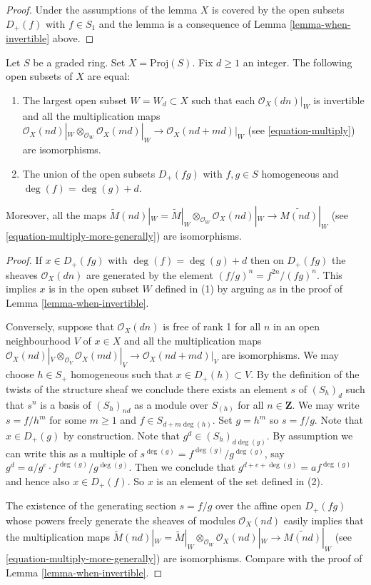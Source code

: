 \begin{proof}
Under the assumptions of the lemma $X$ is covered by the
open subsets $D_{+}(f)$ with $f \in S_1$ and the
lemma is a consequence of Lemma \ref{lemma-when-invertible} above.
\end{proof}

\begin{lemma}
\label{lemma-where-invertible}
Let $S$ be a graded ring. Set $X = \text{Proj}(S)$. Fix $d \geq 1$ an
integer. The following open subsets of $X$ are equal:
\begin{enumerate}
\item The largest open subset $W = W_d \subset X$ such that
each $\mathcal{O}_X(dn)|_W$ is invertible and all the
multiplication maps
$\mathcal{O}_X(nd)|_W \otimes_{\mathcal{O}_W} \mathcal{O}_X(md)|_W
\to \mathcal{O}_X(nd + md)|_W$
(see \ref{equation-multiply}) are isomorphisms.
\item The union of the open subsets $D_{+}(fg)$ with
$f, g \in S$ homogeneous and $\deg(f) = \deg(g) + d$.
\end{enumerate}
Moreover, all the maps
$\widetilde M(nd)|_W = \widetilde M|_W \otimes_{\mathcal{O}_W}
\mathcal{O}_X(nd)|_W \to \widetilde{M(nd)}|_W$
(see \ref{equation-multiply-more-generally}) are isomorphisms.
\end{lemma}

\begin{proof}
If $x \in D_{+}(fg)$ with $\deg(f) = \deg(g) + d$ then
on $D_{+}(fg)$ the sheaves $\mathcal{O}_X(dn)$
are generated by the element $(f/g)^n = f^{2n}/(fg)^n$. This implies $x$
is in the open subset $W$ defined in (1) by arguing as in the
proof of Lemma \ref{lemma-when-invertible}.

\medskip\noindent
Conversely, suppose that $\mathcal{O}_X(dn)$ is free of rank 1
for all $n$ in an open neighbourhood $V$ of $x \in X$ and all the
multiplication maps
$\mathcal{O}_X(nd)|_V \otimes_{\mathcal{O}_V} \mathcal{O}_X(md)|_V
\to \mathcal{O}_X(nd + md)|_V$ are isomorphisms.
We may choose $h \in S_{+}$ homogeneous such that $x \in D_{+}(h) \subset V$.
By the definition of the twists of the structure sheaf we conclude there
exists an element $s$ of $(S_h)_d$ such that $s^n$ is a basis of $(S_h)_{nd}$
as a module over $S_{(h)}$ for all $n \in \mathbf{Z}$.
We may write
$s = f/h^m$ for some $m \geq 1$ and $f \in S_{d + m \deg(h)}$.
Set $g = h^m$ so $s = f/g$. Note that $x \in D_{+}(g)$ by construction.
Note that $g^d \in (S_h)_{d\deg(g)}$.
By assumption we can write this as a multiple of
$s^{\deg(g)} = f^{\deg(g)}/g^{\deg(g)}$, say
$g^d = a/g^e \cdot f^{\deg(g)}/g^{\deg(g)}$.
Then we conclude that $g^{d + e + \deg(g)} = a f^{\deg(g)}$
and hence also $x \in D_{+}(f)$. So $x$ is an element of the set defined
in (2).

\medskip\noindent
The existence of the generating section $s = f/g$ over
the affine open $D_{+}(fg)$ whose
powers freely generate the sheaves of modules
$\mathcal{O}_X(nd)$ easily implies that the multiplication maps
$\widetilde M(nd)|_W = \widetilde M|_W \otimes_{\mathcal{O}_W}
\mathcal{O}_X(nd)|_W \to \widetilde{M(nd)}|_W$
(see \ref{equation-multiply-more-generally})
are isomorphisms. Compare with the proof of Lemma \ref{lemma-when-invertible}.
\end{proof}

